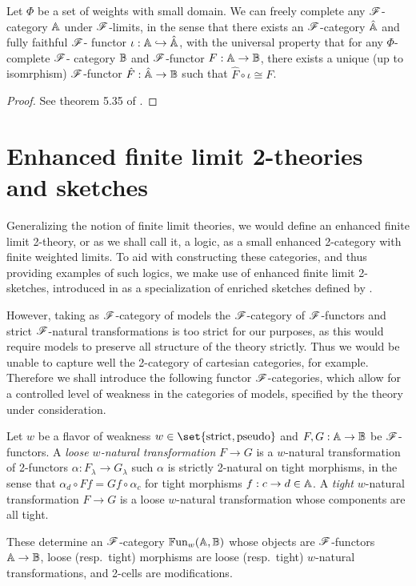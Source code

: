 \documentclass[../thesis.tex]{subfiles}
\begin{document}
  \begin{theorem}\label{thm:free completion}
    Let $\Phi$ be a set of weights with small domain. We can freely complete any ${\mathscr{F}}$-category ${\mathbb{A}}$ under
    ${\mathscr{F}}$-limits, in the sense that there exists an ${\mathscr{F}}$-category $\hat{{\mathbb{A}}}$ and fully faithful ${\mathscr{F}}$-%
    functor $\iota : {\mathbb{A}} \hookrightarrow \hat {{\mathbb{A}}}$, with the universal property that for any $\Phi$-complete ${\mathscr{F}}$-%
    category ${\mathbb{B}}$ and ${\mathscr{F}}$-functor $F : {\mathbb{A}} \to {\mathbb{B}}$, there exists a unique (up to isomrphism) ${\mathscr{F}}$-functor
    $\hat F : \hat{{\mathbb{A}}} \to {\mathbb{B}}$ such that $\hat F \circ \iota \cong F$.
  \end{theorem}
  \begin{proof}
    See theorem 5.35 of \cite{kelly1982a}.
  \end{proof}

  \section{Enhanced finite limit 2-theories and sketches}
  Generalizing the notion of finite limit theories, we would define an enhanced finite limit 2-theory,
  or as we shall call it, a logic, as a small enhanced 2-category with finite weighted limits. To aid
  with constructing these categories, and thus providing examples of such logics, we make use of
  enhanced finite limit 2-sketches, introduced in \cite{arkor2024} as a specialization of enriched
  sketches defined by \cite{kelly1982a}. 

  However, taking as ${\mathscr{F}}$-category of models the ${\mathscr{F}}$-category of ${\mathscr{F}}$-functors and strict ${\mathscr{F}}$-natural
  transformations is too strict for our purposes, as this would require models to preserve all structure
  of the theory strictly. Thus we would be unable to capture well the 2-category of cartesian categories,
  for example. Therefore we shall introduce the following functor ${\mathscr{F}}$-categories, which allow for a
  controlled level of weakness in the categories of models, specified by the theory under consideration.
  
  \begin{definition}
    Let $w$ be a flavor of weakness $w \in \set{\text{strict},\text{pseudo}}$ and $F, G : {\mathbb{A}} \to {\mathbb{B}}$
    be ${\mathscr{F}}$-functors. A \emph{loose $w$-natural transformation} $F \to G$ is a $w$-natural transformation
    of 2-functors $\alpha : F_\lambda \to G_\lambda$ such $\alpha$ is strictly 2-natural on tight morphisms,
    in the sense that $\alpha_d \circ F f = G f \circ \alpha_c$ for tight morphisms $f : c \to d \in {\mathbb{A}}$. 
    A \emph{tight} $w$-natural transformation $F \to G$ is a loose $w$-natural transformation whose components
    are all tight.

    These determine an ${\mathscr{F}}$-category ${\mathbb{F}\mathrm{un}}_w({\mathbb{A}},{\mathbb{B}})$ whose objects are ${\mathscr{F}}$-functors ${\mathbb{A}} \to
    {\mathbb{B}}$, loose (resp.\ tight) morphisms are loose (resp.\ tight) $w$-natural transformations,
    and 2-cells are modifications. 
  \end{definition}
\end{document}

